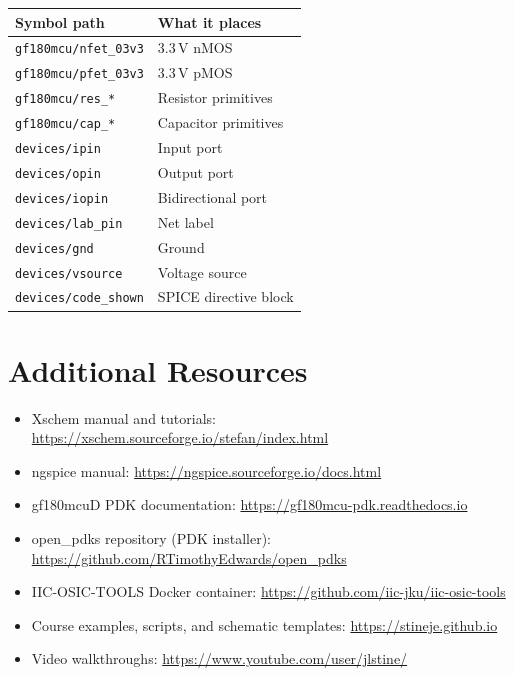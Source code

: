 \documentclass[11pt]{article}
\begin{document}
\begin{center}
\begin{tabular}{@{}ll@{}}
\toprule
\textbf{Symbol path} & \textbf{What it places} \\
\midrule
\texttt{gf180mcu/nfet\_03v3}   & 3.3\,V nMOS \\
\texttt{gf180mcu/pfet\_03v3}   & 3.3\,V pMOS \\
\texttt{gf180mcu/res\_*}       & Resistor primitives \\
\texttt{gf180mcu/cap\_*}       & Capacitor primitives \\
\texttt{devices/ipin}          & Input port \\
\texttt{devices/opin}          & Output port \\
\texttt{devices/iopin}         & Bidirectional port \\
\texttt{devices/lab\_pin}      & Net label \\
\texttt{devices/gnd}           & Ground \\
\texttt{devices/vsource}       & Voltage source \\
\texttt{devices/code\_shown}   & SPICE directive block \\
\bottomrule
\end{tabular}
\end{center}

\section*{Additional Resources}

\begin{itemize}[leftmargin=2em]
  \item Xschem manual and tutorials:
        \url{https://xschem.sourceforge.io/stefan/index.html}
  \item ngspice manual:
        \url{https://ngspice.sourceforge.io/docs.html}
  \item gf180mcuD PDK documentation:
        \url{https://gf180mcu-pdk.readthedocs.io}
  \item open\_pdks repository (PDK installer):
        \url{https://github.com/RTimothyEdwards/open_pdks}
  \item IIC-OSIC-TOOLS Docker container:
        \url{https://github.com/iic-jku/iic-osic-tools}
  \item Course examples, scripts, and schematic templates:
        \url{https://stineje.github.io}
  \item Video walkthroughs:
        \url{https://www.youtube.com/user/jlstine/}
\end{itemize}
\end{document}
